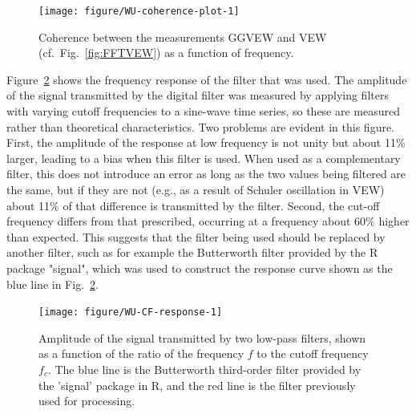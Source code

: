 \documentclass[12pt,twoside,english]{article}\usepackage[]{graphicx}\usepackage[]{color}
\newenvironment{knitrout}{}{} %
\begin{document}
\begin{knitrout}\footnotesize
{}\color{fgcolor}\begin{figure}

{\centering \texttt{[image: figure/WU-coherence-plot-1]} 

}

\caption{Coherence between the measurements GGVEW and VEW (cf.~Fig.~\ref{fig:FFTVEW}) as a function of frequency.}\label{fig:coherence-plot}
\end{figure}


\end{knitrout}

Figure~\ref{fig:CF-response} shows the frequency response of the filter that was used. The amplitude of the signal transmitted by the digital filter was measured by applying filters with varying cutoff frequencies to a sine-wave time series, so these are measured rather than theoretical characteristics. 
Two problems are evident in this figure. 
First, the amplitude of the response at low frequency is not unity but about 
11\% larger, leading to a bias when this filter is used. 
When used as a complementary filter, this does not introduce an error as long as the two values being filtered are the same, but if they are not (e.g., as a result of Schuler oscillation in VEW) about 11\% of that difference is transmitted by the filter. 
Second, the cut-off frequency differs from that prescribed, occurring at a frequency about 60\% higher than expected. 
This suggests that the filter being used should be replaced by another filter, such as for example the Butterworth filter provided by the R package "signal", which was used to construct the response curve shown as the blue line in Fig.~\ref{fig:CF-response}.

\begin{knitrout}\footnotesize
{}\color{fgcolor}\begin{figure}

{\centering \texttt{[image: figure/WU-CF-response-1]} 

}

\caption[Amplitude of the signal transmitted by two low-pass filters, shown as a function of the ratio of the frequency ]{Amplitude of the signal transmitted by two low-pass filters, shown as a function of the ratio of the frequency $f$ to the cutoff frequency $f_c$. The blue line is the Butterworth third-order filter provided by the 'signal' package in R, and the red line is the filter previously used for processing.}\label{fig:CF-response}
\end{figure}


\end{knitrout}
\end{document}
